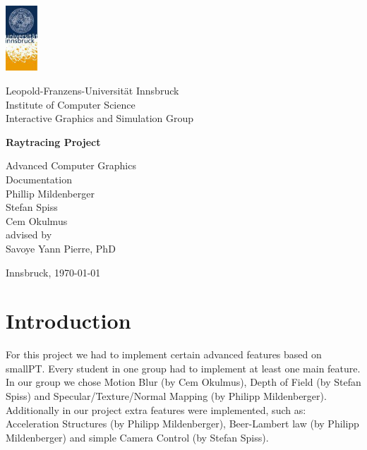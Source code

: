 \documentclass[11pt,a4paper]{article}
\begin{document}

\begin{titlepage} %

\begin{center}
\includegraphics[width=1.2cm]{images/uibk}

\begin{large}
Leopold-Franzens-Universität Innsbruck\\[5mm]
Institute of Computer Science\\
Interactive Graphics and Simulation Group\\[25mm]
\end{large}

{\LARGE \bf Raytracing Project}

Advanced Computer Graphics\\ 
Documentation\\[15mm]

Phillip Mildenberger\\
Stefan Spiss\\
Cem Okulmus\\[35mm]

advised by\\
Savoye Yann Pierre, PhD\\[10mm]

\vfill

Innsbruck, \today
\end{center}

\end{titlepage}



\section{Introduction}
For this project we had to implement certain advanced features based on smallPT. Every student in one group had to implement at least one main feature. In our group we chose Motion Blur (by Cem Okulmus), Depth of Field (by Stefan Spiss) and Specular/Texture/Normal Mapping (by Philipp Mildenberger). Additionally in our project extra features were implemented, such as: Acceleration Structures (by Philipp Mildenberger), Beer-Lambert law (by Philipp Mildenberger) and simple Camera Control (by Stefan Spiss).
\end{document}
